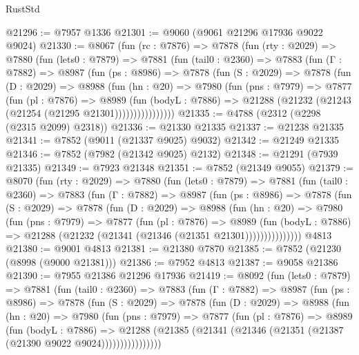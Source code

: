 \begin{lexlean}{RustStd}
\begin{coremodule}
@21296 := @7957 @1336
@21301 := @9060 (@9061 @21296 @17936 @9022 @9024)
@21330 := @8067
    (fun (rc : @7876) =>
    @7878
      (fun (rty : @2029) =>
      @7880
        (fun (lets0 : @7879) =>
        @7881
          (fun (tail0 : @2360) =>
          @7883
            (fun (Γ : @7882) =>
            @8987
              (fun (ps : @8986) =>
              @7878
                (fun (S : @2029) =>
                @7878
                  (fun (D : @2029) =>
                  @8988
                    (fun (hn : @20) =>
                    @7980
                      (fun (pns : @7979) =>
                      @7877
                        (fun (pl : @7876) =>
                        @8989
                          (fun (bodyL : @7886) =>
                          @21288 (@21232 (@21243 (@21254 (@21295 @21301))))))))))))))))
@21335 := @4788 (@2312 (@2298 (@2315 @2099) @2318))
@21336 := @21330 @21335
@21337 := @21238 @21335
@21341 := @7852 (@9011 (@21337 @9025) @9032)
@21342 := @21249 @21335
@21346 := @7852 (@7982 (@21342 @9025) @2132)
@21348 := @21291 (@7939 @21335)
@21349 := @7923 @21348
@21351 := @7852 (@21349 @9055)
@21379 := @8070
    (fun (rty : @2029) =>
    @7880
      (fun (lets0 : @7879) =>
      @7881
        (fun (tail0 : @2360) =>
        @7883
          (fun (Γ : @7882) =>
          @8987
            (fun (ps : @8986) =>
            @7878
              (fun (S : @2029) =>
              @7878
                (fun (D : @2029) =>
                @8988
                  (fun (hn : @20) =>
                  @7980
                    (fun (pns : @7979) =>
                    @7877
                      (fun (pl : @7876) =>
                      @8989
                        (fun (bodyL : @7886) =>
                        @21288 (@21232 (@21341 (@21346 (@21351 @21301)))))))))))))))
    @4813
@21380 := @9001 @4813
@21381 := @21380 @7870
@21385 := @7852 (@21230 (@8998 (@9000 @21381)))
@21386 := @7952 @4813
@21387 := @9058 @21386
@21390 := @7955 @21386 @21296 @17936
@21419 := @8092
    (fun (lets0 : @7879) =>
    @7881
      (fun (tail0 : @2360) =>
      @7883
        (fun (Γ : @7882) =>
        @8987
          (fun (ps : @8986) =>
          @7878
            (fun (S : @2029) =>
            @7878
              (fun (D : @2029) =>
              @8988
                (fun (hn : @20) =>
                @7980
                  (fun (pns : @7979) =>
                  @7877
                    (fun (pl : @7876) =>
                    @8989
                      (fun (bodyL : @7886) =>
                      @21288
                        (@21385 (@21341 (@21346 (@21351 (@21387 (@21390 @9022 @9024))))))))))))))))

\end{coremodule}
\end{lexlean}
